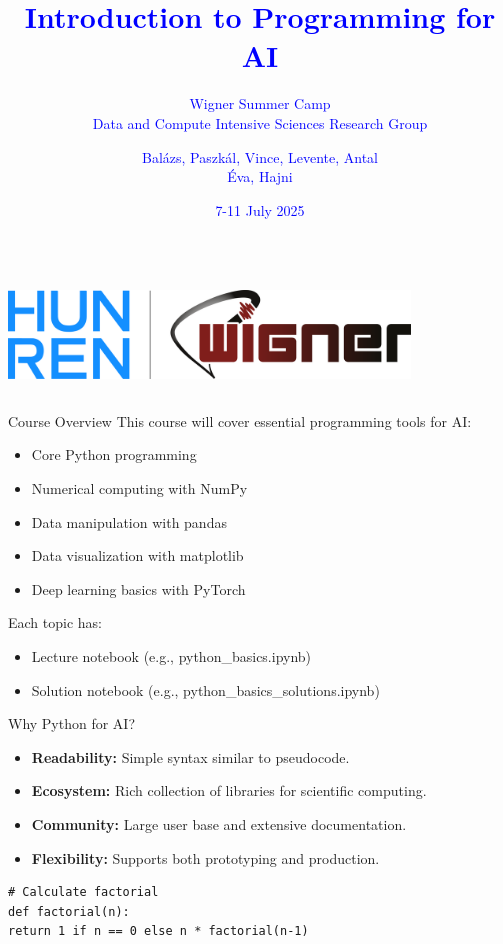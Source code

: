 \documentclass{beamer}
\title{\textcolor{blue}{Introduction to Programming for AI}}
\subtitle{\textcolor{blue}{Wigner Summer Camp \\ Data and Compute Intensive Sciences Research Group}}
\author{\textcolor{blue}{Balázs, Paszkál, Vince, Levente, Antal \\ Éva, Hajni}}
\date{\textcolor{blue}{7-11 July 2025}}
\begin{document}
	
	\begin{frame}
		\titlepage
		\begin{columns}
			\centering
			\centering
			\includegraphics[width=0.8\textwidth]{img/logo.png}
		\end{columns}
	\end{frame}
	
	\begin{frame}{Course Overview}
		This course will cover essential programming tools for AI:
		\begin{itemize}
			\item Core Python programming
			\item Numerical computing with NumPy
			\item Data manipulation with pandas
			\item Data visualization with matplotlib
			\item Deep learning basics with PyTorch
		\end{itemize}
		
		Each topic has:
		\begin{itemize}
			\item Lecture notebook (e.g., python\_basics.ipynb)
			\item Solution notebook (e.g., python\_basics\_solutions.ipynb)
		\end{itemize}
	\end{frame}
	
	\begin{frame}[fragile]{Why Python for AI?}
	    \begin{itemize}
			\item \textbf{Readability:} Simple syntax similar to pseudocode.
			\item \textbf{Ecosystem:} Rich collection of libraries for scientific computing.
			\item \textbf{Community:} Large user base and extensive documentation.
			\item \textbf{Flexibility:} Supports both prototyping and production.
		\end{itemize}
	
		\begin{example}
			\begin{lstlisting}
# Calculate factorial
def factorial(n):
return 1 if n == 0 else n * factorial(n-1)
			\end{lstlisting}
		\end{example}
	\end{frame}
	
\end{document}
